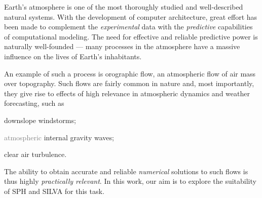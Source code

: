 \documentclass[../main.tex]{subfiles}
\begin{document}
Earth's atmosphere is one of the most thoroughly studied and well-described natural systems. With the development of computer architecture, great effort has been made to complement the \emph{experimental} data with the \emph{predictive} capabilities of computational modeling. The need for effective and reliable predictive power is naturally well-founded --- many processes in the atmosphere have a massive influence on the lives of Earth's inhabitants.

An example of such a process is orographic flow, an atmospheric flow of air mass over topography. Such flows are fairly common in nature and, most importantly, they give rise to effects of high relevance in atmospheric dynamics and weather forecasting, such as

\begin{compactenum}
	\item downslope windstorms;
	\item \textcolor{gray}{atmospheric} internal gravity waves\sidenotemark;
	\item clear air turbulence.
\end{compactenum}


The ability to obtain accurate and reliable \emph{numerical} solutions to such flows is thus highly \emph{practically relevant}.\sidenotemark {} In this work, our aim is to explore the suitability of SPH and SILVA for this task.
\end{document}
